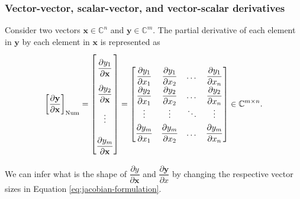 \documentclass{article}
\begin{document}
\subsubsection{Vector-vector, scalar-vector, and vector-scalar derivatives}
Consider two vectors \(\mathbf{x} \in \mathbb{C}^n\) and \(\mathbf{y} \in \mathbb{C}^m\). The partial derivative of each element in \(\mathbf{y}\) by each element in \(\mathbf{x}\) is represented as
\begin{align}
    \label{eq:jacobian-formulation}
    \left[ \dfrac{\partial \mathbf{y}}{\partial \mathbf{x}} \right]_{\textnormal{Num}} = \renewcommand{\arraystretch}{2.6} \begin{bmatrix}
        \dfrac{\partial y_1}{\partial \mathbf{x}} \\
        \dfrac{\partial y_2}{\partial \mathbf{x}} \\ 
        \vdots \\ 
        \dfrac{\partial y_m}{\partial \mathbf{x}}
    \end{bmatrix} = \renewcommand{\arraystretch}{1.8}
    \begin{bmatrix}
        \dfrac{\partial y_1}{\partial x_1} & \dfrac{\partial y_1}{\partial x_2} & \dots & \dfrac{\partial y_1}{\partial x_n} \\
        \dfrac{\partial y_2}{\partial x_1} & \dfrac{\partial y_2}{\partial x_2} & \dots & \dfrac{\partial y_2}{\partial x_n} \\
        \vdots & \vdots & \ddots & \vdots \\
        \dfrac{\partial y_m}{\partial x_1} & \dfrac{\partial y_m}{\partial x_2} & \dots & \dfrac{\partial y_m}{\partial x_n} \\
    \end{bmatrix} \in \mathbb{C}^{m\times n}.
\end{align}

We can infer what is the shape of \(\dfrac{\partial y}{\partial \mathbf{x}}\) and \(\dfrac{\partial \mathbf{y}}{\partial x}\) by changing the respective vector sizes in Equation \eqref{eq:jacobian-formulation}.
\end{document}
